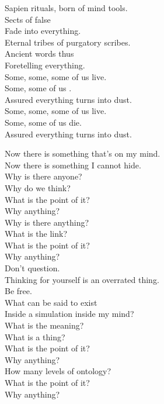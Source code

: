Sapien rituals, born of mind tools. \\
Sects of false  \\
Fade into everything. \\
Eternal tribes of purgatory scribes. \\
Ancient words thus \\
Foretelling everything. \\

Some, some, some of us live. \\
Some, some of us . \\
Assured everything turns into dust. \\

Some, some, some of us live. \\
Some, some of us die. \\
Assured everything turns into dust. \\





Now there is something that's on my mind. \\
Now there is something I cannot hide. \\

Why is there anyone? \\
Why do we think? \\
What is the point of it? \\
Why anything? \\
Why is there anything? \\
What is the link? \\
What is the point of it? \\
Why anything? \\

Don't question. \\
Thinking for yourself is an overrated thing. \\
Be free. \\

What can be said to exist \\
Inside a simulation inside my mind? \\

What is the meaning? \\
What is a thing? \\
What is the point of it? \\
Why anything? \\
How many levels of ontology? \\
What is the point of it? \\
Why anything? \\

